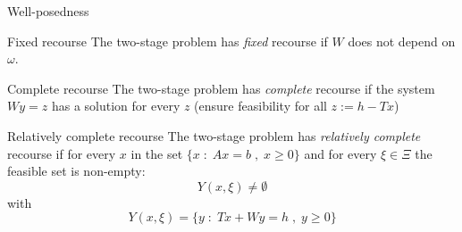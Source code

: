 \begin{frame}{Well-posedness}
  \begin{block}{Fixed recourse}
    The two-stage problem has \emph{fixed} recourse if $W$ does
    not depend on $\omega$.
  \end{block}

  \begin{block}{Complete recourse}
    The two-stage problem has \emph{complete} recourse if the system
    $W y = z$ has a solution for every $z$ (ensure feasibility for all $z := h - Tx$)
  \end{block}

  \begin{block}{Relatively complete recourse}
    The two-stage problem has \emph{relatively complete} recourse
    if for every $x$ in the set $\{ x \; : \; Ax = b \;, \; x \geq 0 \}$
    and for every $\xi \in \Xi$ the feasible set is non-empty:
    \begin{equation*}
     Y(x, \xi) \neq \emptyset
    \end{equation*}
    with
    \begin{equation*}
      Y(x, \xi) = \{ y \; : \; Tx + Wy = h \;, \; y \geq 0 \}
    \end{equation*}
  \end{block}
\end{frame}


